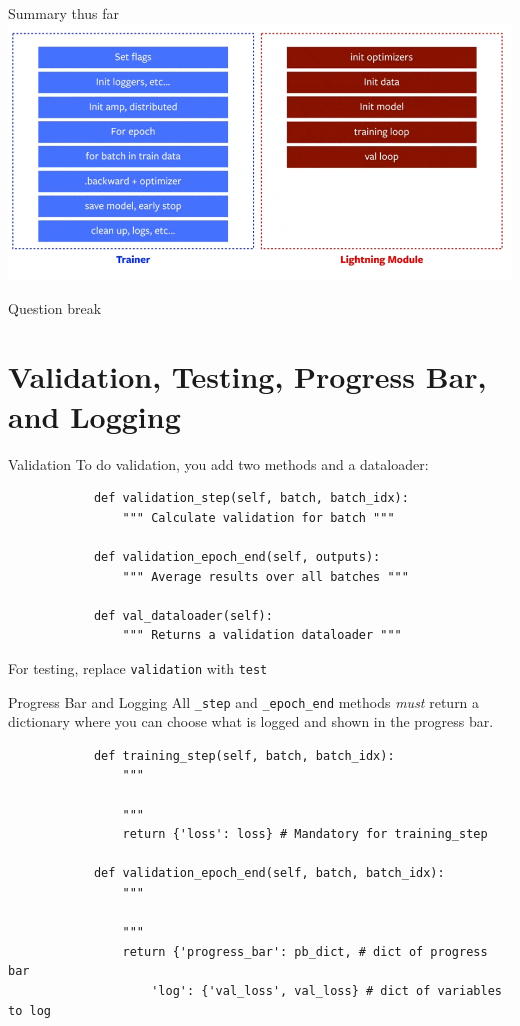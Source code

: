 \documentclass[aspectratio=169]{beamer}
\begin{document}
	\begin{frame}{Summary thus far}
		\centering
		\includegraphics[height=0.7\textheight]{research_engineering.png}
	\end{frame}

	\begin{frame}[standout]
		\LARGE Question break
	\end{frame}

	\section{Validation, Testing, Progress Bar, and Logging}

	\begin{frame}[fragile]{Validation}
		To do validation, you add two methods and a dataloader:
		\begin{verbatim}
			def validation_step(self, batch, batch_idx):
				""" Calculate validation for batch """

			def validation_epoch_end(self, outputs):
				""" Average results over all batches """

			def val_dataloader(self):
				""" Returns a validation dataloader """
		\end{verbatim}
		\vfill
		For testing, replace \texttt{validation} with \texttt{test}
	\end{frame}

	\begin{frame}[fragile]{Progress Bar and Logging}
		All \texttt{\_step} and \texttt{\_epoch\_end} methods \emph{must} return a dictionary where you can choose what is logged and shown in the progress bar.
		\begin{verbatim}
			def training_step(self, batch, batch_idx):
				""" 
				
				"""
				return {'loss': loss} # Mandatory for training_step

			def validation_epoch_end(self, batch, batch_idx):
				""" 
				
				"""
				return {'progress_bar': pb_dict, # dict of progress bar
					'log': {'val_loss', val_loss} # dict of variables to log
		\end{verbatim}
	\end{frame}
\end{document}
